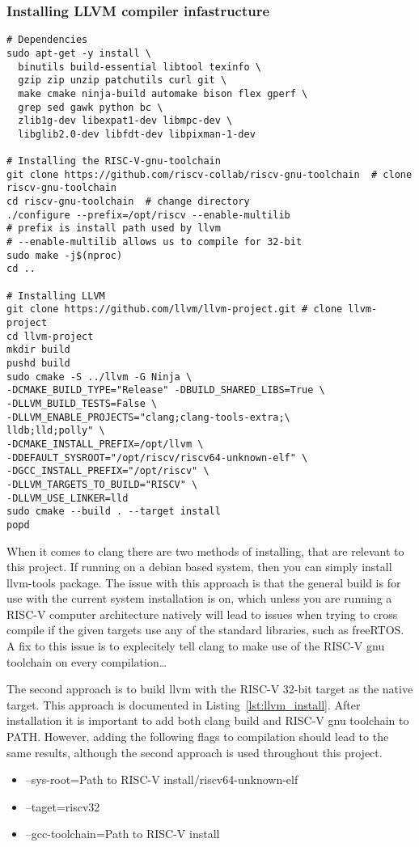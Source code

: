 \subsubsection{Installing LLVM compiler infastructure}
\begin{lstlisting}[caption=Installing LLVM compiler infastructure with RISC-V
32-bit as native target., float=*, label=lst:llvm_install]
# Dependencies
sudo apt-get -y install \
  binutils build-essential libtool texinfo \
  gzip zip unzip patchutils curl git \
  make cmake ninja-build automake bison flex gperf \
  grep sed gawk python bc \
  zlib1g-dev libexpat1-dev libmpc-dev \
  libglib2.0-dev libfdt-dev libpixman-1-dev

# Installing the RISC-V-gnu-toolchain
git clone https://github.com/riscv-collab/riscv-gnu-toolchain  # clone
riscv-gnu-toolchain
cd riscv-gnu-toolchain  # change directory
./configure --prefix=/opt/riscv --enable-multilib
# prefix is install path used by llvm
# --enable-multilib allows us to compile for 32-bit
sudo make -j$(nproc)
cd ..

# Installing LLVM
git clone https://github.com/llvm/llvm-project.git # clone llvm-project
cd llvm-project
mkdir build
pushd build
sudo cmake -S ../llvm -G Ninja \
-DCMAKE_BUILD_TYPE="Release" -DBUILD_SHARED_LIBS=True \
-DLLVM_BUILD_TESTS=False \
-DLLVM_ENABLE_PROJECTS="clang;clang-tools-extra;\
lldb;lld;polly" \
-DCMAKE_INSTALL_PREFIX=/opt/llvm \
-DDEFAULT_SYSROOT="/opt/riscv/riscv64-unknown-elf" \
-DGCC_INSTALL_PREFIX="/opt/riscv" \
-DLLVM_TARGETS_TO_BUILD="RISCV" \
-DLLVM_USE_LINKER=lld
sudo cmake --build . --target install
popd
\end{lstlisting}
When it comes to clang there are two methods of installing, that are relevant to
this project. If running on a debian based system, then you can simply install
llvm-tools package. The issue with this approach is that the general build is
for use with the current system installation is on, which unless you are running
a RISC-V computer architecture natively will lead to issues when trying to cross
compile if the given targets use any of the standard libraries, such as
freeRTOS. A fix to this issue is to explecitely tell clang to make use of the
RISC-V gnu toolchain on every compilation\dots

The second approach is to build llvm with the RISC-V 32-bit target as the native
target. This approach is documented in Listing~\ref{lst:llvm_install}. After
installation it is important to add both clang build and RISC-V gnu toolchain to
PATH. However, adding the following flags to compilation
should lead to the same results, although the second approach is used throughout
this project.
\begin{itemize}
  \item --sys-root={Path to RISC-V install}/riscv64-unknown-elf
  \item --taget=riscv32
  \item --gcc-toolchain={Path to RISC-V install}
\end{itemize}


